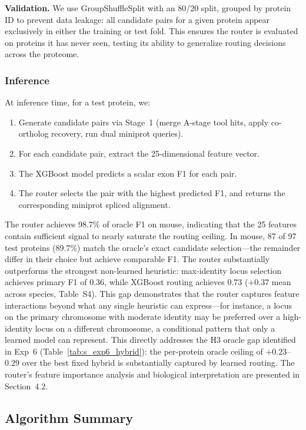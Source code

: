 \textbf{Validation.} We use GroupShuffleSplit with an 80/20 split, grouped by protein ID to prevent data leakage: all candidate pairs for a given protein appear exclusively in either the training or test fold. This ensures the router is evaluated on proteins it has never seen, testing its ability to generalize routing decisions across the proteome.

\subsubsection{Inference}

At inference time, for a test protein, we:
\begin{enumerate}
    \item Generate candidate pairs via Stage~1 (merge A-stage tool hits, apply co-ortholog recovery, run dual miniprot queries).
    \item For each candidate pair, extract the 25-dimensional feature vector.
    \item The XGBoost model predicts a scalar exon F1 for each pair.
    \item The router selects the pair with the highest predicted F1, and returns the corresponding miniprot spliced alignment.
\end{enumerate}

The router achieves 98.7\% of oracle F1 on mouse, indicating that the 25 features contain sufficient signal to nearly saturate the routing ceiling. In mouse, 87 of 97 test proteins (89.7\%) match the oracle's exact candidate selection---the remainder differ in their choice but achieve comparable F1. The router substantially outperforms the strongest non-learned heuristic: max-identity locus selection achieves primary F1 of 0.36, while XGBoost routing achieves 0.73 (+0.37 mean across species, Table~S4). This gap demonstrates that the router captures feature interactions beyond what any single heuristic can express---for instance, a locus on the primary chromosome with moderate identity may be preferred over a high-identity locus on a different chromosome, a conditional pattern that only a learned model can represent. This directly addresses the H3 oracle gap identified in Exp~6 (Table~\ref{tab:s_exp6_hybrid}): the per-protein oracle ceiling of $+0.23$--$0.29$ over the best fixed hybrid is substantially captured by learned routing. The router's feature importance analysis and biological interpretation are presented in Section~4.2.

\subsection{Algorithm Summary}

